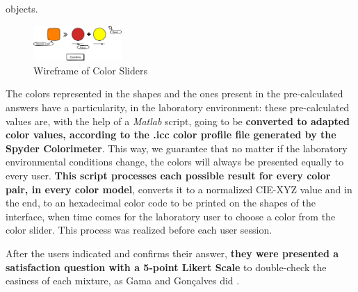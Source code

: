 objects.
%
\begin{figure}[htbp]
	\centering
  \includegraphics[width=0.3\textwidth]{images/sliders.png}
  \caption{Wireframe of Color Sliders}
  \label{fig:sliders}
\end{figure} \par
%
The colors represented in the shapes and the ones present in the pre-calculated answers have a particularity,
in the laboratory environment: these pre-calculated values are, with the help of a \emph{Matlab} script,
going to be \textbf{converted to adapted color values, according to the .icc color profile file generated by
the Spyder Colorimeter}. This way, we guarantee that no matter if the laboratory environmental conditions
change, the colors will always be presented equally to every user. \textbf{This script processes each possible
result for every color pair, in every color model}, converts it to a normalized CIE-XYZ value and in the end,
to an hexadecimal color code to be printed on the shapes of the interface, when time comes for the laboratory
user to choose a color from the color slider. This process was realized before each user session. \par
%
After the users indicated and confirms their answer, \textbf{they were presented a satisfaction question with
a 5-point Likert Scale} to double-check the easiness of each mixture, as Gama and Gonçalves did \cite{Gama20141}.
